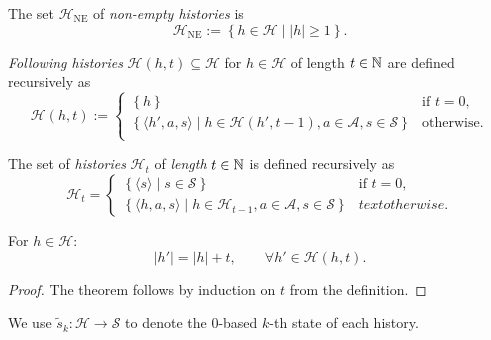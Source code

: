 \begin{definition} \label{def:hist-ne}
The set $\mathcal{H}_{\mathrm{NE}}$ of \emph{non-empty histories} is
\[
\mathcal{H}_{\mathrm{NE}} := \left\{ h \in \mathcal{H} \mid  |h| \ge 1 \right\}.
\]
\end{definition}

\begin{definition}\label{def:histories}
  \emph{Following histories} $\mathcal{H}(h,t) \subseteq \mathcal{H}$ for $h\in \mathcal{H}$ of length $t\in \mathbb{N}$ are defined recursively as
  \[
    \mathcal{H}(h,t) :=
    \begin{cases}
    \left\{  h \right\}  &\text{if } t = 0, \\
    \left\{  \langle h', a, s \rangle \mid h\in \mathcal{H}(h', t-1), a\in \mathcal{A}, s\in \mathcal{S}  \right\}  &\text{otherwise}. \\
    \end{cases}
  \]
\end{definition}

\begin{definition} \label{def:histories-horizon}
  The set of \emph{histories} $\mathcal{H}_{t}$ of \emph{length} $t \in \mathbb{N}$ is defined recursively as
  \[
    \mathcal{H}_t =
    \begin{cases}
      \left\{ \langle s \rangle \mid  s\in \mathcal{S} \right\} &\text{if } t = 0, \\
      \left\{ \langle h, a, s\rangle \mid h \in \mathcal{H}_{t-1}, a\in \mathcal{A}, s\in \mathcal{S} \right\} &text{otherwise}.
    \end{cases}
  \]
\end{definition}

\begin{theorem} \label{thm:hist-lenth-eq-horizon}
  For $h \in \mathcal{H}$:
  \[
   |h'| = |h| + t, \qquad \forall h'\in \mathcal{H}(h, t).
  \]
\end{theorem}
\begin{proof}
The theorem follows by induction on $t$ from the definition.  
\end{proof}

\begin{definition}
  We use $\tilde{s}_k\colon \mathcal{H} \to \mathcal{S}$ to denote the 0-based $k$-th state of each history.
\end{definition}

